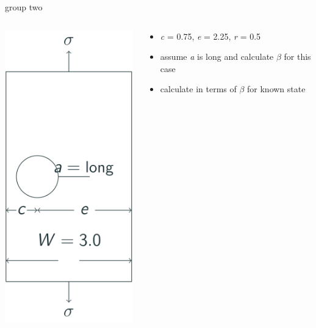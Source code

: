 \documentclass[
  letterpaper,
  ignorenonframetext,
  aspectratio=43,
  handout,
  12pt]{beamer}
\providecommand{\tightlist}{%
  \setlength{\itemsep}{0pt}\setlength{\parskip}{0pt}}
\providecommand{\tightlist}{%
\setlength{\itemsep}{0pt}\setlength{\parskip}{0pt}}
\let\Oldincludegraphics\includegraphics
\renewcommand{\includegraphics}[2][]{\Oldincludegraphics[width=\textwidth,height=0.7\textheight,keepaspectratio]{#2}}
\begin{document}
\begin{frame}{group two}
\protect\hypertarget{group-two}{}
\begin{columns}[T]
\begin{column}{0.5\textwidth}
\includegraphics{../images/curved-group2.svg}
\end{column}

\begin{column}{0.5\textwidth}
\begin{itemize}
\tightlist
\item
  \emph{c} = 0.75, \emph{e} = 2.25, \emph{r} = 0.5
\item
  assume \emph{a} is long and calculate \(\beta\) for this case
\item
  calculate in terms of \(\beta\) for known state
\end{itemize}
\end{column}
\end{columns}
\end{frame}
\end{document}
